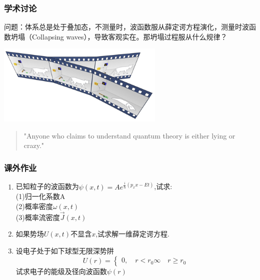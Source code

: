 \begin{frame}
    \frametitle{学术讨论}
    问题：体系总是处于叠加态，不测量时，波函数服从薛定谔方程演化，测量时波函数坍塌（Collapsing waves），导致客观实在。那坍塌过程服从什么规律？\\
    \begin{center}
        \includegraphics[width=0.6\textwidth]{figs/2022-01-17-13-13-18.png} \\
    \end{center} 
    \begin{quote}
    "Anyone who claims to understand quantum theory is either lying or crazy." \\
    \end{quote}
\end{frame}

\begin{frame}
    \frametitle{课外作业}
    \begin{enumerate}
        \item 已知粒子的波函数为$\psi(x,t)=Ae^{\frac{i}{\hbar}(p_x x - E t)}$,试求:\\
                (1)归一化系数A\\
                (2)概率密度$\omega(x,t)$\\
                (3)概率流密度$\vec{J}(x,t)$
        \item 如果势场$U(x,t)$不显含$x$,试求解一维薛定谔方程. 
        \item 设电子处于如下球型无限深势阱
        \[ U(r)= \begin{cases}
            0, \quad r<r_0
            \infty \quad r\geq r_0
        \end{cases} 
        \]
        试求电子的能级及径向波函数$\psi(r)$
    \end{enumerate}
\end{frame}

